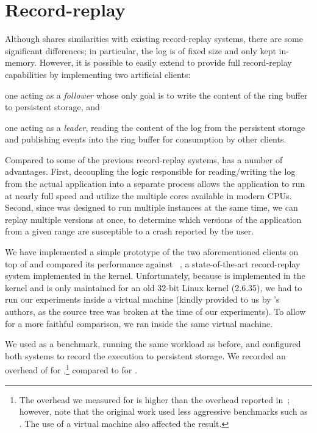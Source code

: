 \section{Record-replay}
\label{sec:record_replay}

Although \varan shares similarities with existing record-replay systems, there
are some significant differences; in particular, the log is of fixed size and
only kept in-memory.  However, it is possible to easily extend \varan to
provide full record-replay capabilities by implementing two artificial clients:
\begin{inparaenum}[(i)]
\item one acting as a \emph{follower} whose only goal is to write the
  content of the ring buffer to persistent storage, and
\item one acting as a \emph{leader}, reading the content of the log
  from the persistent storage and publishing events into the ring
  buffer for consumption by other clients.
\end{inparaenum}

Compared to some of the previous record-replay systems, \varan has a
number of advantages. First, decoupling the logic responsible for
reading/writing the log from the actual application into a separate
process allows the application to run at nearly full speed and utilize
the multiple cores available in modern CPUs.  Second, since \varan was
designed to run multiple instances at the same time, we can replay
multiple versions at once, \eg to determine which versions of the
application from a given range are susceptible to a crash reported by
the user.

We have implemented a simple prototype of the two aforementioned
clients on top of \varan and compared its performance against
\scribe~\cite{scribe}, a state-of-the-art record-replay system
implemented in the kernel.  Unfortunately, because \scribe is
implemented in the kernel and is only maintained for an old 32-bit
Linux kernel (2.6.35), we had to run our experiments inside a virtual
machine (kindly provided to us by \scribe's authors, as the source tree
was broken at the time of our experiments). 
To allow for a more faithful comparison, we ran \varan inside the same
virtual machine.

We used \redis as a benchmark, running the same workload as before,
and configured both systems to record the execution to persistent
storage.  We recorded an overhead of \redisRROvhScribe for
\scribe,\footnote{The overhead we measured for \scribe is higher than
  the overhead reported in~\cite{scribe}; however, note that the original
  work used less aggressive benchmarks such as \httpd.  The use of a
  virtual machine also affected the result.}  compared to
\redisRROvhNx for \varan.



